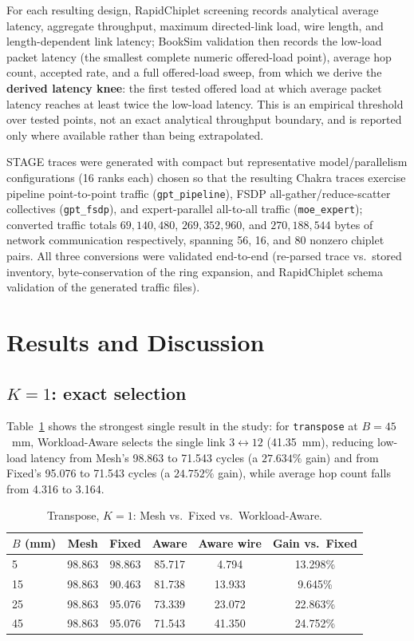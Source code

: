\documentclass[conference]{IEEEtran}
\begin{document}
For each resulting design, RapidChiplet screening records analytical average latency, aggregate throughput, maximum directed-link load, wire length, and length-dependent link latency; BookSim validation then records the low-load packet latency (the smallest complete numeric offered-load point), average hop count, accepted rate, and a full offered-load sweep, from which we derive the \textbf{derived latency knee}: the first tested offered load at which average packet latency reaches at least twice the low-load latency. This is an empirical threshold over tested points, not an exact analytical throughput boundary, and is reported only where available rather than being extrapolated.

STAGE traces were generated with compact but representative model/parallelism configurations (16 ranks each) chosen so that the resulting Chakra traces exercise pipeline point-to-point traffic (\texttt{gpt\_pipeline}), FSDP all-gather/reduce-scatter collectives (\texttt{gpt\_fsdp}), and expert-parallel all-to-all traffic (\texttt{moe\_expert}); converted traffic totals $69{,}140{,}480$, $269{,}352{,}960$, and $270{,}188{,}544$ bytes of network communication respectively, spanning 56, 16, and 80 nonzero chiplet pairs. All three conversions were validated end-to-end (re-parsed trace vs.\ stored inventory, byte-conservation of the ring expansion, and RapidChiplet schema validation of the generated traffic files).

\section{Results and Discussion}
\label{sec:results}

\subsection{$K{=}1$: exact selection}
Table~\ref{tab:k1-transpose} shows the strongest single result in the study: for \texttt{transpose} at $B{=}45$~mm, Workload-Aware selects the single link $3{\leftrightarrow}12$ (41.35~mm), reducing low-load latency from Mesh's 98.863 to 71.543 cycles (a $27.634\%$ gain) and from Fixed's 95.076 to 71.543 cycles (a $24.752\%$ gain), while average hop count falls from 4.316 to 3.164.

\begin{table}[t]
\centering
\caption{Transpose, $K{=}1$: Mesh vs.\ Fixed vs.\ Workload-Aware.}
\label{tab:k1-transpose}
\small
\begin{tabular}{lccccc}
\toprule
$B$ (mm) & Mesh & Fixed & Aware & Aware wire & Gain vs.\ Fixed\\
\midrule
5  & 98.863 & 98.863 & 85.717 & 4.794  & 13.298\% \\
15 & 98.863 & 90.463 & 81.738 & 13.933 & 9.645\%  \\
25 & 98.863 & 95.076 & 73.339 & 23.072 & 22.863\% \\
45 & 98.863 & 95.076 & 71.543 & 41.350 & 24.752\% \\
\bottomrule
\end{tabular}
\end{table}
\end{document}
